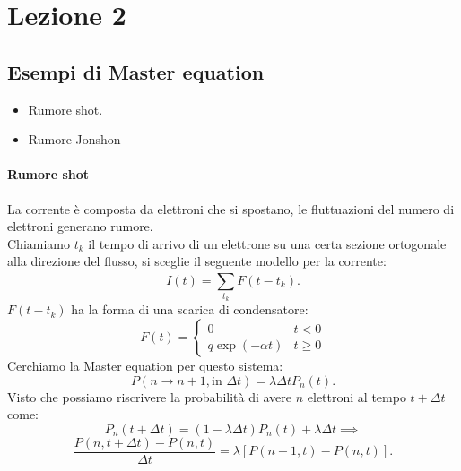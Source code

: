 \section{Lezione 2}%
\label{sub:Lezione 2}

\subsection{Esempi di Master equation}%
\begin{itemize}
    \item Rumore shot.
    \item Rumore Jonshon
\end{itemize}
\paragraph{Rumore shot}%
La corrente è composta da elettroni che si spostano, le fluttuazioni del numero di elettroni generano rumore.\\
Chiamiamo $t_k$ il tempo di arrivo di un elettrone su una certa sezione ortogonale alla direzione del flusso, si sceglie il seguente modello per la corrente:
\[
    I(t) = \sum_{t_k}^{} F(t-t_k) 
.\] 
$F(t-t_k)$ ha la forma di una scarica di condensatore:
\[
    F(t) = \begin{cases}
	0	 			&t<0\\
	q \exp\left(-\alpha t\right) 	&t \ge 0
    \end{cases}
\] 
Cerchiamo la Master equation per questo sistema:
\[
    P(n\to n+1, \text{in }\Delta  t) = \lambda \Delta tP_n(t) 
.\] 
Visto che possiamo riscrivere la probabilità di avere $n$ elettroni al tempo $t+\Delta t$ come: 
\[
    P_n(t+\Delta  t) = \left(1-\lambda\Delta t\right)P_n(t) + \lambda\Delta t  \implies 
\] 
\[
	\frac{P(n, t+\Delta  t) - P(n,t)}{\Delta t} = \lambda\left[P(n-1,t) -P(n,t)\right] 
.\] 
